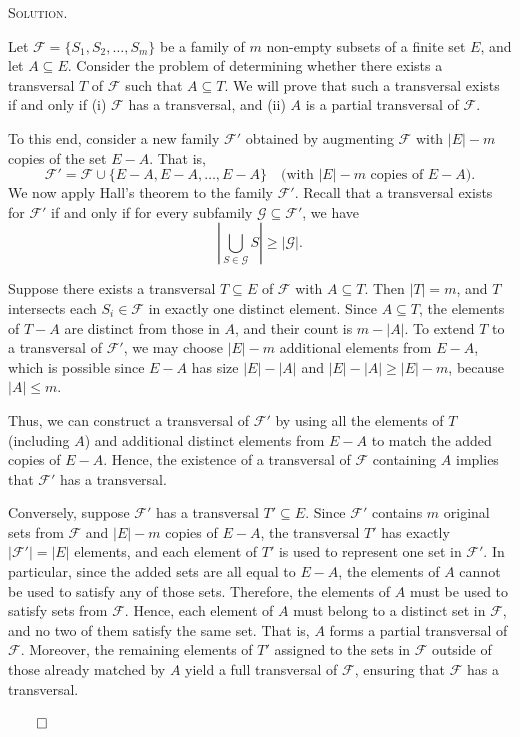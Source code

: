 \documentclass[12pt, a4paper, oneside]{ctexart}
\newenvironment{solution}{%
	\par\noindent\textsc{Solution. }\ignorespaces
}{%
	\hfill$\qed$\par
}
\begin{document}
	\begin{solution}
		
		Let \( \mathcal{F} = \{S_1, S_2, \ldots, S_m\} \) be a family of \( m \) non-empty subsets of a finite set \( E \), and let \( A \subseteq E \). Consider the problem of determining whether there exists a transversal \( T \) of \( \mathcal{F} \) such that \( A \subseteq T \). We will prove that such a transversal exists if and only if (i) \( \mathcal{F} \) has a transversal, and (ii) \( A \) is a partial transversal of \( \mathcal{F} \).
		
		To this end, consider a new family \( \mathcal{F}' \) obtained by augmenting \( \mathcal{F} \) with \( |E| - m \) copies of the set \( E - A \). That is,
		\[
		\mathcal{F}' = \mathcal{F} \cup \{E - A, E - A, \ldots, E - A\} \quad \text{(with } |E| - m \text{ copies of } E - A).
		\]
		We now apply Hall's theorem to the family \( \mathcal{F}' \). Recall that a transversal exists for \( \mathcal{F}' \) if and only if for every subfamily \( \mathcal{G} \subseteq \mathcal{F}' \), we have
		\[
		\left|\bigcup_{S \in \mathcal{G}} S\right| \geq |\mathcal{G}|.
		\]
		
		Suppose there exists a transversal \( T \subseteq E \) of \( \mathcal{F} \) with \( A \subseteq T \). Then \( |T| = m \), and \( T \) intersects each \( S_i \in \mathcal{F} \) in exactly one distinct element. Since \( A \subseteq T \), the elements of \( T - A \) are distinct from those in \( A \), and their count is \( m - |A| \). To extend \( T \) to a transversal of \( \mathcal{F}' \), we may choose \( |E| - m \) additional elements from \( E - A \), which is possible since \( E - A \) has size \( |E| - |A| \) and \( |E| - |A| \geq |E| - m \), because \( |A| \leq m \).
		
		Thus, we can construct a transversal of \( \mathcal{F}' \) by using all the elements of \( T \) (including \( A \)) and additional distinct elements from \( E - A \) to match the added copies of \( E - A \). Hence, the existence of a transversal of \( \mathcal{F} \) containing \( A \) implies that \( \mathcal{F}' \) has a transversal.
		
		Conversely, suppose \( \mathcal{F}' \) has a transversal \( T' \subseteq E \). Since \( \mathcal{F}' \) contains \( m \) original sets from \( \mathcal{F} \) and \( |E| - m \) copies of \( E - A \), the transversal \( T' \) has exactly \( |\mathcal{F}'| = |E| \) elements, and each element of \( T' \) is used to represent one set in \( \mathcal{F}' \). In particular, since the added sets are all equal to \( E - A \), the elements of \( A \) cannot be used to satisfy any of those sets. Therefore, the elements of \( A \) must be used to satisfy sets from \( \mathcal{F} \). Hence, each element of \( A \) must belong to a distinct set in \( \mathcal{F} \), and no two of them satisfy the same set. That is, \( A \) forms a partial transversal of \( \mathcal{F} \). Moreover, the remaining elements of \( T' \) assigned to the sets in \( \mathcal{F} \) outside of those already matched by \( A \) yield a full transversal of \( \mathcal{F} \), ensuring that \( \mathcal{F} \) has a transversal.
		

\end{solution}
\end{document}
